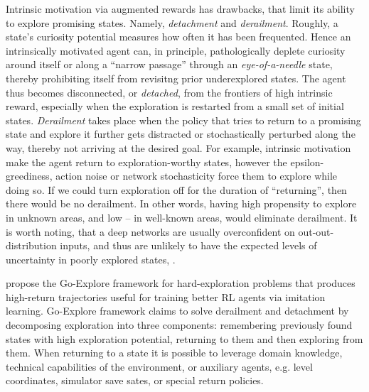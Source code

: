 \documentclass[acmsmall, nonacm]{acmart}
\begin{document}
\medskip
Intrinsic motivation via augmented rewards has drawbacks, that limit its ability to
explore promising states. Namely, \emph{detachment} and \emph{derailment}.
%
Roughly, a state's curiosity potential measures how often it has been frequented. Hence
an intrinsically motivated agent can, in principle, pathologically deplete curiosity
around itself or along a ``narrow passage'' through an \emph{eye-of-a-needle} state,
thereby prohibiting itself from revisitng prior underexplored states. The agent thus
becomes disconnected, or \emph{detached}, from the frontiers of high intrinsic reward,
especially when the exploration is restarted from a small set of initial states.
%
\emph{Derailment} takes place when the policy that tries to return to a promising state
and explore it further gets distracted or stochastically perturbed along the way, thereby
not arriving at the desired goal.
%
For example, intrinsic motivation make the agent return to exploration-worthy states,
however the epsilon-greediness, action noise or network stochasticity force them to
explore while doing so. If we could turn exploration off for the duration of ``returning'',
then there would be no derailment. In other words, having high propensity to explore
in unknown areas, and low -- in well-known areas, would eliminate derailment.
%
It is worth noting, that a deep networks are usually overconfident on out-out-distribution
inputs, and thus are unlikely to have the expected levels of uncertainty in poorly explored
states, \citep[p.~34]{ecoffet_first_2021}.  %

\citet{ecoffet_go-explore_2021} propose the Go-Explore framework for hard-exploration
problems that produces high-return trajectories useful for training better RL agents
via imitation learning.
%
Go-Explore framework claims to solve derailment and detachment by decomposing exploration
into three components: remembering previously found states with high exploration potential,
returning to them and then exploring from them. When returning to a state it is possible
to leverage domain knowledge, technical capabilities of the environment, or auxiliary agents,
e.g. level coordinates, simulator save sates, or special return policies.
\end{document}
